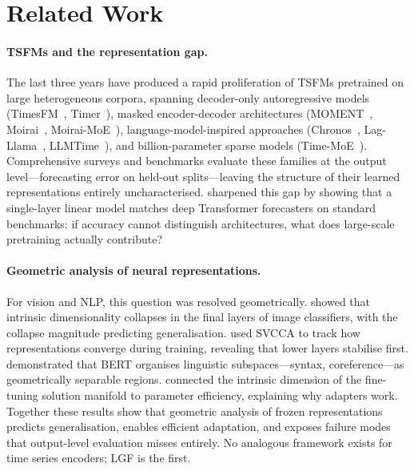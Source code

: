 \documentclass[10pt]{article}
\theoremstyle{definition}
\theoremstyle{remark}
\begin{document}
\section{Related Work}
\label{sec:related}

\paragraph{TSFMs and the representation gap.}
The last three years have produced a rapid proliferation of TSFMs pretrained
on large heterogeneous corpora, spanning decoder-only autoregressive models
(TimesFM~\citep{das2024timesfm,das2025timesfm2}, Timer~\citep{liu2024timer}),
masked encoder-decoder architectures
(MOMENT~\citep{goswami2024moment}, Moirai~\citep{woo2024moirai},
Moirai-MoE~\citep{woo2024moiraimoe}), language-model-inspired approaches
(Chronos~\citep{ansari2024chronos}, Lag-Llama~\citep{rasul2024lagllama},
LLMTime~\citep{gruver2023llmts}), and billion-parameter sparse models
(Time-MoE~\citep{shi2024timemoe}).
Comprehensive surveys \citep{liang2024foundation,jin2023large,meyer2025tsfmreview}
and benchmarks \citep{aksu2024gifteval,qiu2024tfb,li2025tsfmbench} evaluate
these families at the output level---forecasting error on held-out splits---leaving
the structure of their learned representations entirely uncharacterised.
\citet{zeng2023transformers} sharpened this gap by showing that a single-layer
linear model matches deep Transformer forecasters on standard benchmarks:
if accuracy cannot distinguish architectures, what does large-scale pretraining
actually contribute?

\paragraph{Geometric analysis of neural representations.}
For vision and NLP, this question was resolved geometrically.
\citet{ansuini2019intrinsic} showed that intrinsic dimensionality collapses
in the final layers of image classifiers, with the collapse magnitude predicting
generalisation.
\citet{raghu2017svcca} used SVCCA to track how representations converge during
training, revealing that lower layers stabilise first.
\citet{reif2019visualizing} demonstrated that BERT organises linguistic
subspaces---syntax, coreference---as geometrically separable regions.
\citet{aghajanyan2021intrinsic} connected the intrinsic dimension of the
fine-tuning solution manifold to parameter efficiency, explaining why adapters
work.
Together these results show that geometric analysis of frozen representations
predicts generalisation, enables efficient adaptation, and exposes failure modes
that output-level evaluation misses entirely.
No analogous framework exists for time series encoders; LGF is the first.
\end{document}
